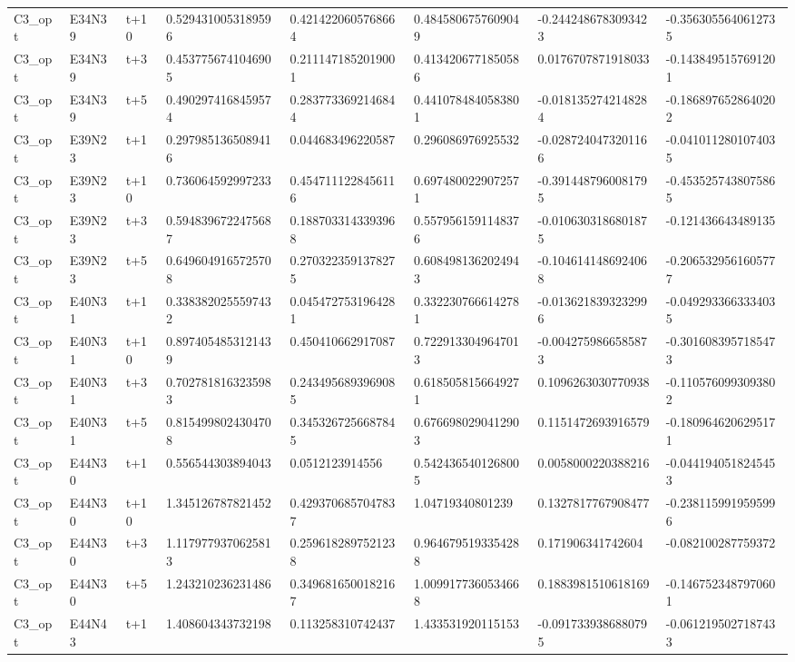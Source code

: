 \begin{landscape}
\begin{longtable}{llllllll}
C3\_opt & E34N39 & t+10 & 0.5294310053189596 & 0.4214220605768664 & 0.4845806757609049 & -0.2442486783093423 & -0.3563055640612735 \\
C3\_opt & E34N39 & t+3 & 0.4537756741046905 & 0.2111471852019001 & 0.4134206771850586 & 0.0176707871918033 & -0.1438495157691201 \\
C3\_opt & E34N39 & t+5 & 0.4902974168459574 & 0.2837733692146844 & 0.4410784840583801 & -0.0181352742148284 & -0.1868976528640202 \\
C3\_opt & E39N23 & t+1 & 0.2979851365089416 & 0.044683496220587 & 0.296086976925532 & -0.0287240473201166 & -0.0410112801074035 \\
C3\_opt & E39N23 & t+10 & 0.736064592997233 & 0.4547111228456116 & 0.6974800229072571 & -0.3914487960081795 & -0.4535257438075865 \\
C3\_opt & E39N23 & t+3 & 0.5948396722475687 & 0.1887033143393968 & 0.5579561591148376 & -0.0106303186801875 & -0.121436643489135 \\
C3\_opt & E39N23 & t+5 & 0.6496049165725708 & 0.2703223591378275 & 0.6084981362024943 & -0.1046141486924068 & -0.2065329561605777 \\
C3\_opt & E40N31 & t+1 & 0.3383820255597432 & 0.0454727531964281 & 0.3322307666142781 & -0.0136218393232996 & -0.0492933663334035 \\
C3\_opt & E40N31 & t+10 & 0.8974054853121439 & 0.450410662917087 & 0.7229133049647013 & -0.0042759866585873 & -0.3016083957185473 \\
C3\_opt & E40N31 & t+3 & 0.7027818163235983 & 0.2434956893969085 & 0.6185058156649271 & 0.1096263030770938 & -0.1105760993093802 \\
C3\_opt & E40N31 & t+5 & 0.8154998024304708 & 0.3453267256687845 & 0.6766980290412903 & 0.1151472693916579 & -0.1809646206295171 \\
C3\_opt & E44N30 & t+1 & 0.556544303894043 & 0.0512123914556 & 0.5424365401268005 & 0.0058000220388216 & -0.0441940518245453 \\
C3\_opt & E44N30 & t+10 & 1.345126787821452 & 0.4293706857047837 & 1.04719340801239 & 0.1327817767908477 & -0.2381159919595996 \\
C3\_opt & E44N30 & t+3 & 1.1179779370625813 & 0.2596182897521238 & 0.9646795193354288 & 0.171906341742604 & -0.082100287759372 \\
C3\_opt & E44N30 & t+5 & 1.243210236231486 & 0.3496816500182167 & 1.0099177360534668 & 0.1883981510618169 & -0.1467523487970601 \\
C3\_opt & E44N43 & t+1 & 1.408604343732198 & 0.113258310742437 & 1.433531920115153 & -0.0917339386880795 & -0.0612195027187433 \\

\end{longtable}
\end{landscape}
